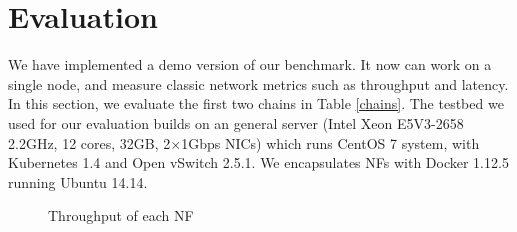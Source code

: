\section{Evaluation}
We have implemented a demo version of our benchmark.
It now can work on a single node,
and measure classic network metrics such as throughput and latency.
In this section, we evaluate the first two chains in Table \ref{chains}. 
The testbed we used for our evaluation builds on an general server (Intel Xeon E5V3-2658 2.2GHz, 12 cores, 32GB, 2$\times$1Gbps NICs) which runs CentOS 7 system, with Kubernetes 1.4 and Open vSwitch 2.5.1. We encapsulates NFs with Docker 1.12.5 running Ubuntu 14.14. 


%

\begin{figure}[!t]
\centering
{}
\hfil
{}
\hfil
\caption{Throughput of each NF}
\label{throughput}
\end{figure}



